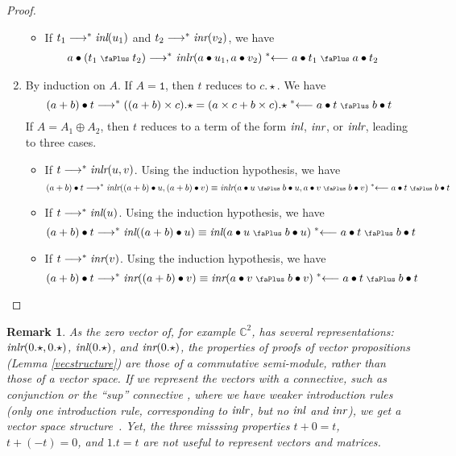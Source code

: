 \documentclass[screen, sigconf,authorversion,nonacm]{acmart}
\theoremstyle{acmdefinition}
\newtheorem{remark}[theorem]{Remark}}
\numberwithin{equation}{section}
\newcommand\inl{\mbox{\it inl}}
\newcommand\inr{\mbox{\it inr}}
\newcommand\inlr{\mbox{\it inlr}}
\newcommand\plus{\mathrel{\text{\normalfont\scalebox{0.7}{\faPlus}}}}
\newcommand\lra{\longrightarrow}
\newcommand\lras{\lra^*}
\newcommand\llas{\mathrel{{}^*{\longleftarrow}}}
\newcommand\one{\ensuremath{\mathtt 1}}
\begin{document}
\begin{proof}
\begin{enumerate}
\begin{itemize}
	\item If $t_1 \lra^* \inl(u_1)$ and $t_2 \lra^* \inr(v_2)$, we have
	  \begin{align*}
	    a \bullet (t_1 \plus t_2) \lras &\ \inlr(a \bullet u_1,a
	    \bullet v_2) \llas a \bullet
	    t_1 \plus a \bullet t_2
	  \end{align*}

      \end{itemize}

    \item By induction on $A$.  If $A = \one$, then $t$ reduces to
      $c.\star$. We have
      $$(a + b) \bullet t \lras ((a + b) \times c).\star =
      (a \times c + b \times c).\star \llas a \bullet t \plus b \bullet t$$
      If $A = A_1 \oplus  A_2$, then $t$ reduces
      to
      a term of the form $\inl$, $\inr$, or $\inlr$, leading to three cases.
      \begin{itemize}

	\item If $t \lra^* \inlr(u,v)$.  Using
	  the induction hypothesis, we have
	  \[
	    (a + b) \bullet t  \lras \inlr((a + b) \bullet u,(a + b) \bullet v)
	    \equiv \inlr(a \bullet u \plus b \bullet u,a \bullet v \plus b \bullet v)
	    \llas a \bullet t \plus b \bullet t
	  \]
	\item If $t \lra^* \inl(u)$.  Using
	  the induction hypothesis, we have
	  \[
	    (a + b) \bullet t  \lras \inl((a + b) \bullet u)
	    \equiv \inl(a \bullet u \plus b \bullet u)
	    \llas a \bullet t \plus b \bullet t
	  \]

	\item If $t \lra^* \inr(v)$.  Using
	  the induction hypothesis, we have
	  \[
	    (a + b) \bullet t  \lras \inr((a + b) \bullet v)
	    \equiv \inr(a \bullet v \plus b \bullet v)
	    \llas a \bullet t \plus b \bullet t
	    \tag*{\qedhere}
	  \]
      \end{itemize}
  \end{enumerate}
\end{proof}


\begin{remark}
As the zero vector of, for example $\mathbb{C}^2$, has several representations:
$\inlr(0.\star, 0.\star)$, $\inl(0.\star)$, and $\inr(0.\star)$, the properties
of proofs of vector propositions (Lemma
\ref{vecstructure}) are those of a
commutative semi-module, rather than those of a vector space. If we represent
the vectors with a connective, such as conjunction or the ``sup'' connective
\cite{DiazcaroDowekTCS23}, where we have weaker introduction rules
(only one introduction rule, corresponding to $\inlr$, but no $\inl$
and $\inr$), we get a vector space structure~\cite[Lemma
  3.4]{DiazcaroDowekMSCS24}. Yet, the three misssing properties $t + 0
= t$, $t + (-t) = 0$, and $1 . t = t$ are not useful to represent
vectors and matrices.
\end{remark}
\end{document}
